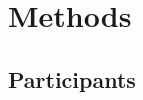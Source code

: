 \documentclass[
12pt, %
english, %
doublespacing, %
nolistspacing, %
liststotoc, %
headsepline, %
chapterinoneline, %
openany, %
]{DoctoralThesis}\usepackage[]{graphicx}\usepackage[]{color}
\begin{document}


\section{Methods}


\subsection{Participants}
\end{document}
